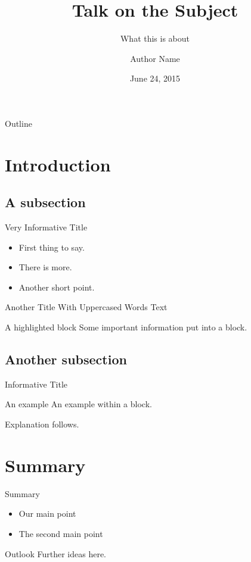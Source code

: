 \documentclass{beamer}
\begin{document}
\title{Talk on the Subject}
\subtitle{What this is about}
\author{Author Name}
\date{June 24, 2015}
\begin{frame}
  \titlepage
\end{frame}
\begin{frame}{Outline}
  \tableofcontents[pausesections]
\end{frame}
\section{Introduction}
\subsection{A subsection}
\begin{frame}{Very Informative Title}
  \begin{itemize}
    \item First thing to say.
    \item There is more.
    \item Another short point.
  \end{itemize}
\end{frame}
\begin{frame}{Another Title With Uppercased Words}
  Text
  \begin{alertblock}{A highlighted block}
    Some important information put into a block.
  \end{alertblock}
\end{frame}
\subsection{Another subsection}
\begin{frame}{Informative Title}
  \begin{exampleblock}{An example}
    An example within a block.
  \end{exampleblock}
  Explanation follows.
\end{frame}
\section{Summary}
\begin{frame}{Summary}
  \begin{itemize}
    \item Our \alert{main point}
    \item The \alert{second main point}
  \end{itemize}
  \vfill
  \begin{block}{Outlook}
    Further ideas here.
  \end{block}
\end{frame}
\end{document}
